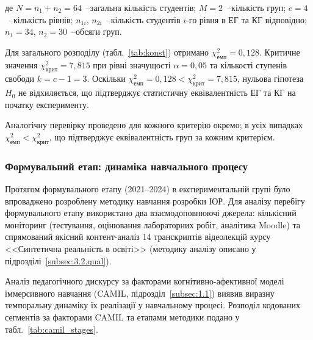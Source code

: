 \noindent де $N = n_1 + n_2 = 64$~--загальна кількість студентів; $M = 2$~--кількість груп; $c = 4$~--кількість рівнів; $n_{1i}$, $n_{2i}$~--кількість студентів $i$-го рівня в ЕГ та КГ відповідно; $n_1 = 34$, $n_2 = 30$~--обсяги груп.

Для загального розподілу (табл.~\ref{tab:konst}) отримано $\chi^2_{\text{емп}} = 0{,}128$. Критичне значення $\chi^2_{\text{крит}} = 7{,}815$ при рівні значущості $\alpha = 0{,}05$ та кількості ступенів свободи $k = c - 1 = 3$. Оскільки $\chi^2_{\text{емп}} = 0{,}128 < \chi^2_{\text{крит}} = 7{,}815$, нульова гіпотеза $H_0$ не відхиляється, що підтверджує статистичну еквівалентність ЕГ та КГ на початку експерименту.

Аналогічну перевірку проведено для кожного критерію окремо; в усіх випадках $\chi^2_{\text{емп}} < \chi^2_{\text{крит}}$, що підтверджує еквівалентність груп за кожним критерієм.


\subsubsection{Формувальний етап: динаміка навчального процесу}

Протягом формувального етапу (2021--2024) в експериментальній групі було впроваджено розроблену методику навчання розробки ІОР. Для аналізу перебігу формувального етапу використано два взаємодоповнюючі джерела: кількісний моніторинг (тестування, оцінювання лабораторних робіт, аналітика Moodle) та спрямований якісний контент-аналіз 14 транскриптів відеолекцій курсу <<Синтетична реальність в освіті>> (методику аналізу описано у підрозділі~\ref{subsec:3.2.qual}).


Аналіз педагогічного дискурсу за факторами когнітивно-афективної моделі іммерсивного навчання (CAMIL, підрозділ~\ref{subsec:1.1}) виявив виразну темпоральну динаміку їх реалізації у навчальному процесі. Розподіл кодованих сегментів за факторами CAMIL та етапами методики подано у табл.~\ref{tab:camil_stages}.

